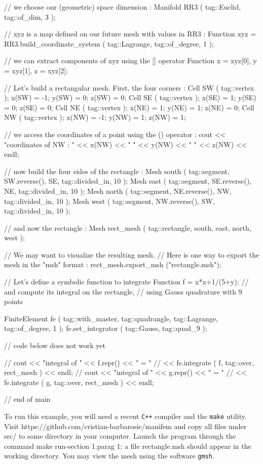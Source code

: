 {  // we choose our (geometric) space dimension :
   Manifold RR3 ( tag::Euclid, tag::of_dim, 3 );
   
   // xyz is a map defined on our future mesh with values in RR3 :
   Function xyz = RR3.build_coordinate_system ( tag::Lagrange, tag::of_degree, 1 );

   // we can extract components of xyz using the [] operator
   Function x = xyz[0],  y = xyz[1],  z = xyz[2];

   // Let's build a rectangular mesh. First, the four corners :
   Cell SW ( tag::vertex );  x(SW) = -1;  y(SW) = 0;  z(SW) = 0;
   Cell SE ( tag::vertex );  x(SE) =  1;  y(SE) = 0;  z(SE) = 0;
   Cell NE ( tag::vertex );  x(NE) =  1;  y(NE) = 1;  z(NE) = 0;
   Cell NW ( tag::vertex );  x(NW) = -1;  y(NW) = 1;  z(NW) = 1;
   
   // we access the coordinates of a point using the () operator :
   cout << "coordinates of NW : " << x(NW) << " " << y(NW) << " " << z(NW) << endl;
   
   // now build the four sides of the rectangle :
   Mesh south ( tag::segment, SW.reverse(), SE, tag::divided_in, 10 );
   Mesh east  ( tag::segment, SE.reverse(), NE, tag::divided_in, 10 );
   Mesh north ( tag::segment, NE.reverse(), NW, tag::divided_in, 10 );
   Mesh west  ( tag::segment, NW.reverse(), SW, tag::divided_in, 10 );
   
   // and now the rectangle :
   Mesh rect_mesh ( tag::rectangle, south, east, north, west );

   // We may want to visualize the resulting mesh.
   // Here is one way to export the mesh in the "msh" format :
   rect_mesh.export_msh ("rectangle.msh");

   // Let's define a symbolic function to integrate
   Function f = x*x+1/(5+y);
   // and compute its integral on the rectangle,
   // using Gauss quadrature with 9 points

   FiniteElement fe
      ( tag::with_master, tag::quadrangle, tag::Lagrange, tag::of_degree, 1 );
   fe.set_integrator ( tag::Gauss, tag::quad_9 );

   // code below does not work yet

   // cout << "integral of " << f.repr() << " = "
   //      << fe.integrate ( f, tag::over, rect_mesh ) << endl;
   // cout << "integral of " << g.repr() << " = "
   //      << fe.integrate ( g, tag::over, rect_mesh ) << endl;

}  // end of main
\endverbatim

To run this example, you will need a recent {\tt C++} compiler and the {\tt make} utility.
Visit {\codett https://github.com/cristian-barbarosie/manifem}
and copy all files under {\codett src/} to some directory in your computer.
Launch the program through the command {\codett make run-\numb section 1.\numb parag 1};
a file {\codett rectangle.msh} should appear in the working directory.
You may view the mesh using the software {\tt gmsh}.

